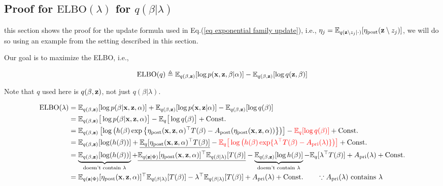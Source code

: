 \documentclass{article}
\def\post{\text{post}}
\def\pri{\text{pri}}
\def\C{\text{Const.}}
\begin{document}

\subsection{Proof for  $\text{ELBO}(\lambda) $ for $q (\beta | \lambda)$ \optional}

this section shows the proof for the update formula used in Eq.(\ref{eq exponential family update}), i.e., $\eta_j =  \E_{q(\z \setminus z_j | \cdot)} [\eta_\post (\z \setminus z_j )]$, we will do so using an example from the setting described in this section.


Our goal is to maximize the ELBO, i.e., 

\begin{equation}\begin{split}
\text{ELBO}(q) \triangleq \mathbb{E}_{q(\beta, {\mathbf z})} [\log p ({\mathbf x}, {\mathbf z}, \beta | \alpha )] - \mathbb{E}_{q(\beta, {\mathbf z})} [\log q({\mathbf z}, \beta)]\\
\end{split}\end{equation}

Note that $q$ used here is $q(\beta, {\mathbf z})$, not just $q(\beta | \lambda)$.

\begin{equation}\begin{split}
\text{ELBO}( \lambda)
&= \E_{q(\beta, \z)} [\log p (\beta | \x, \z, \alpha )] + \E_{q(\beta, \z)} [\log p (\x, \z | \alpha)] - \E_{q(\beta, \z)} [\log q(\beta)] \\
	&= \E_{q(\beta, \z)} \big[\log p (\beta | \x, \z, \alpha )\big] - \E_{q} \big[\log q(\beta)\big]+\C \\
&= \E_{q(\beta, \z)} \left[\log \big(  h (\beta) \exp \big\{ \eta_\post (\x,\z,\alpha)^\top T(\beta) - A_\post (\eta_\post (\x,\z, \alpha)) \big\}  \big) \right] - {\color{red}\E_{q} [\log q(\beta)]}+\C \\
&= \E_{q(\beta, \z)} [\log (h (\beta))] +  \underline{\E_q [ \eta_\post (\x,\z,\alpha)^\top T(\beta) ]} 
   - {\color{red}\E_{q} \big[\log \big( h (\beta) \exp \{ \lambda^\top T(\beta) - A_\pri (\lambda)\} \big) \big]}+\C \\
&= \underbrace{\E_{q(\beta, \z)} [\log (h (\beta))]}_{\text{doesn't contain } \lambda} +\underline{\E_{q(\z|\Phi)} [\eta_\post (\x,\z,\alpha)]^\top  \E_{q (\beta | \lambda)} [  T(\beta) ]} 
   - \underbrace{\E_{q(\beta, \z)} [\log  h (\beta)]}_{\text{doesn't contain } \lambda} - \E_q [ \lambda^\top T(\beta) ]+  A_\pri (\lambda) + \C \\
&=  \E_{q(\z|\Phi)} [\eta_\post (\x,\z,\alpha)]^\top \E_{q(\beta |\lambda)} [  T(\beta) ] - \lambda^\top \E_{q(\beta|\lambda)} [  T(\beta) ]+  A_\pri (\lambda) + \C \quad\quad \because A_\pri (\lambda) \text{ contains } \lambda\\
\end{split}\end{equation}
\end{document}
